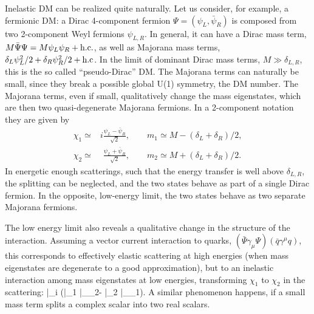 Inelastic DM can be realized quite naturally.
Let us consider, for example, a fermionic DM: a Dirac 4-component fermion  
$\Psi=(\psi_L, \bar\psi_R)$ is composed from two 2-component Weyl fermions $\psi_{L,R}$.
In general, it can have a Dirac mass term, $M\bar \Psi \Psi
=M \psi_L \psi_R + \hbox{h.c.}$, 
as well as Majorana mass terms, $ \delta_L \psi_L^2/2 + \delta_R \psi_R^2/2 +\hbox{h.c} $.
In the limit of dominant Dirac mass terms, $M\gg \delta_{L,R}$, this is the so called ``pseudo-Dirac'' DM.
The Majorana terms can naturally be small, since they break a possible global U(1) symmetry, the DM number.
The Majorana terms, even if small, qualitatively change the mass eigenstates, which are then
 two quasi-degenerate  Majorana fermions.   In a 2-component notation they are given by
\begin{align}
\chi_1\simeq& i \frac{\psi_L - \bar\psi_R}{\sqrt2}, \qquad m_1\simeq M-(\delta_L+ \delta_R)/2,
\\
\chi_2\simeq& \phantom{i}\frac{\psi_L +\bar\psi_R}{\sqrt2}, \qquad m_2\simeq M+(\delta_L+\delta_R)/2.
\end{align}
In energetic enough scatterings, such that the energy transfer is well above $\delta_{L,R}$,
the splitting can be neglected, and the two states behave as part of a single Dirac fermion.
In the opposite, low-energy limit, the two states behave as two separate Majorana fermions. 

The low energy limit also reveals a  qualitative change in the structure of the interaction.
Assuming a vector current interaction to quarks, $(\bar \Psi \gamma_\mu \Psi)(\bar q\gamma^\mu q)$, 
this corresponds to effectively elastic scattering at high energies (when mass eigenstates are degenerate to a good approximation), but to an inelastic interaction among mass eigenstates at low energies, transforming $\chi_1$ to $\chi_2$ in the scattering:
\beq
\bar \Psi\gamma_\mu \Psi\simeq i \big(\bar\chi_1 \bar \sigma_\mu \chi_2- \bar\chi_2 \bar \sigma_\mu \chi_1\big).
\eeq
A similar phenomenon happens, if a small mass term splits a complex scalar into two real scalars.






